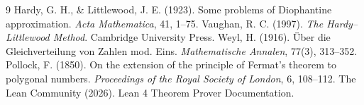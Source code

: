 \documentclass[11pt,a4paper]{article}
\begin{document}

\begin{thebibliography}{9}
  Hardy, G. H., \& Littlewood, J. E. (1923). Some problems of Diophantine approximation. \emph{Acta Mathematica}, 41, 1–75.
  Vaughan, R. C. (1997). \emph{The Hardy–Littlewood Method}. Cambridge University Press.
  Weyl, H. (1916). Über die Gleichverteilung von Zahlen mod. Eins. \emph{Mathematische Annalen}, 77(3), 313–352.
  Pollock, F. (1850). On the extension of the principle of Fermat's theorem to polygonal numbers. \emph{Proceedings of the Royal Society of London}, 6, 108–112.
  The Lean Community (2026). Lean 4 Theorem Prover Documentation.
\end{thebibliography}
\end{document}
